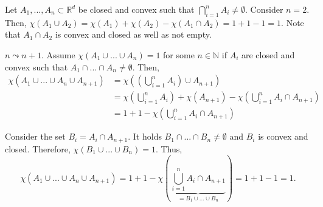 \documentclass[fontsize=11pt, paper=a4]{scrartcl}
\begin{document}



Let $A_1,...,A_n \subset \mathbb R^d$ be closed and convex such that $\bigcap^n_{i=1} A_i \neq \emptyset$. Consider $n = 2$. Then, $\chi(A_1 \cup A_2) = \chi(A_1) + \chi(A_2) - \chi(A_1 \cap A_2) = 1 + 1 - 1 = 1$. Note that $A_1 \cap A_2$ is convex and closed as well as not empty.

$n \leadsto n+1$. Assume $\chi(A_1 \cup ... \cup A_n) = 1$ for some $n \in \mathbb N$ if $A_i$ are closed and convex such that $A_1 \cap ... \cap A_n \neq \emptyset$. Then, 
\begin{align*}
    \chi(A_1 \cup ... \cup A_n \cup A_{n+1}) &= \chi(\left(\bigcup^n_{i=1} A_i\right) \cup A_{n+1})\\
    &= \chi\left(\bigcup^n_{i=1} A_i\right) + \chi(A_{n+1}) - \chi(\bigcup^n_{i=1} A_i \cap A_{n+1}) \\
    &= 1 + 1 - \chi(\bigcup^n_{i=1} A_i \cap A_{n+1})
\end{align*}

Consider the set $B_i = A_i \cap A_{n+1}$. It holds $B_1 \cap ... \cap B_n \neq \emptyset$ and $B_i$ is convex and closed. Therefore, $\chi(B_1 \cup ... \cup B_n) = 1$. Thus, 
$$
\chi(A_1 \cup ... \cup A_n \cup A_{n+1})= 1 + 1 - \chi(\underbrace{\bigcup^n_{i=1} A_i \cap A_{n+1}}_{=B_1 \cup...\cup B_n})= 1+1-1 = 1.
$$

\end{document}
